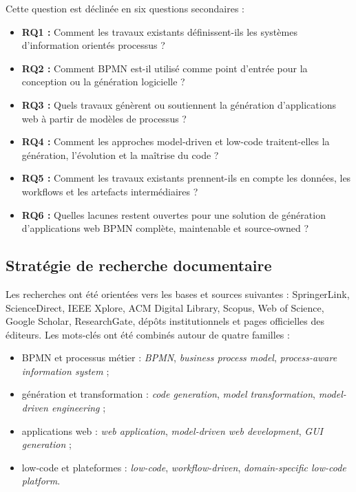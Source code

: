 \documentclass[12pt,a4paper]{article}
\begin{document}
Cette question est déclinée en six questions secondaires :

\begin{itemize}[leftmargin=*]
  \item \textbf{RQ1 :} Comment les travaux existants définissent-ils les systèmes d'information orientés processus ?
  \item \textbf{RQ2 :} Comment BPMN est-il utilisé comme point d'entrée pour la conception ou la génération logicielle ?
  \item \textbf{RQ3 :} Quels travaux génèrent ou soutiennent la génération d'applications web à partir de modèles de processus ?
  \item \textbf{RQ4 :} Comment les approches model-driven et low-code traitent-elles la génération, l'évolution et la maîtrise du code ?
  \item \textbf{RQ5 :} Comment les travaux existants prennent-ils en compte les données, les workflows et les artefacts intermédiaires ?
  \item \textbf{RQ6 :} Quelles lacunes restent ouvertes pour une solution de génération d'applications web BPMN complète, maintenable et source-owned ?
\end{itemize}

\subsection{Stratégie de recherche documentaire}

Les recherches ont été orientées vers les bases et sources suivantes : SpringerLink, ScienceDirect, IEEE Xplore, ACM Digital Library, Scopus, Web of Science, Google Scholar, ResearchGate, dépôts institutionnels et pages officielles des éditeurs. Les mots-clés ont été combinés autour de quatre familles :

\begin{itemize}[leftmargin=*]
  \item BPMN et processus métier : \textit{BPMN}, \textit{business process model}, \textit{process-aware information system} ;
  \item génération et transformation : \textit{code generation}, \textit{model transformation}, \textit{model-driven engineering} ;
  \item applications web : \textit{web application}, \textit{model-driven web development}, \textit{GUI generation} ;
  \item low-code et plateformes : \textit{low-code}, \textit{workflow-driven}, \textit{domain-specific low-code platform}.
\end{itemize}
\end{document}
